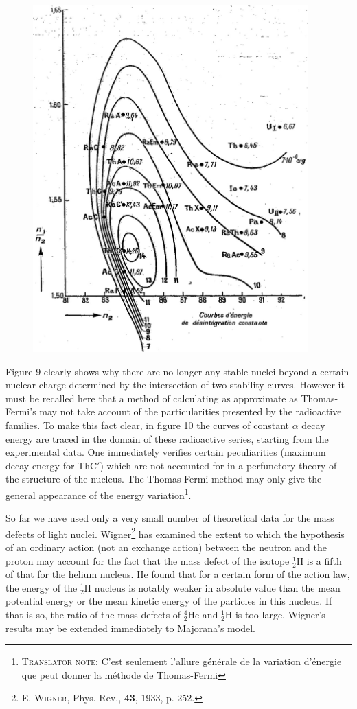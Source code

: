 \documentclass[a4paper,11pt]{article}
\newcommand{\?}[2]{#1\footnote{\textsc{Translator note}: #2}}
\newcommand{\citeauthor}[1]{\textsc{#1}}
\newcommand{\citepub}[1]{#1}
\newcommand{\citevol}[1]{\textbf{#1}}
\newcommand{\citepage}[1]{#1}
\newcommand{\citeyear}[1]{#1}
\newcommand{\El}[1]{\text{#1}}
\newcommand{\mnEl}[3]{{}^{#1}_{#2}{\El{#3}}}
\begin{document}
{{\begin{figure}[h!]
\includegraphics[width=300pt]{images/Fig10}
\end{figure}

Figure 9 clearly shows why there are no longer any stable nuclei beyond a certain nuclear charge determined by the intersection of two stability curves. However it must be recalled here that a method of calculating as approximate as Thomas-Fermi's may not take account of the particularities presented by the radioactive families. To make this fact clear, in figure 10 the curves of constant $\alpha$ decay energy are traced in the domain of these radioactive series, starting from the experimental data. One immediately verifies certain peculiarities (maximum decay energy for $\El{Th}\El{C}'$) which are not accounted for in a perfunctory theory of the structure of the nucleus. \?{The Thomas-Fermi method may only give the general appearance of the energy variation}{C'est seulement l'allure générale de la variation d'énergie que peut donner la méthode de Thomas-Fermi}.

So far we have used only a very small number of theoretical data for the mass defects of light nuclei. Wigner\footnote{\citeauthor{E. Wigner}, \citepub{Phys. Rev.}, \citevol{43}, \citeyear{1933}, \citepage{p. 252}.} has examined the extent to which the hypothesis of an ordinary action (not an exchange action) between the neutron and the proton may account for the fact that the mass defect of the isotope $\mnEl{1}{2}{H}$ is a fifth of that for the helium nucleus. He found that for a certain form of the action law, the energy of the $\mnEl{1}{2}{H}$ nucleus is notably weaker in absolute value than the mean potential energy or the mean kinetic energy of the particles in this nucleus. If that is so, the ratio of the mass defects of $\mnEl{4}{2}{He}$ and $\mnEl{1}{2}{H}$ is too large. Wigner's results may be extended immediately to Majorana's model.

}}
\end{document}
